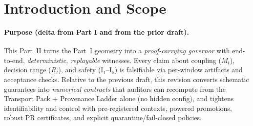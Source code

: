 \documentclass[10pt]{article}
\begin{document}
\section{Introduction and Scope}\label{sec:intro2}

\paragraph{Purpose (delta from Part I and from the prior draft).}
This Part~II turns the Part~I geometry into a \emph{proof-carrying governor} with end-to-end, \emph{deterministic, replayable} witnesses. Every claim about coupling ($M_t$), decision range ($R_t$), and safety (I$_1$--I$_5$) is falsifiable via per-window artifacts and acceptance checks. Relative to the previous draft, this revision converts schematic guarantees into \emph{numerical contracts} that auditors can recompute from the Transport Pack + Provenance Ladder alone (no hidden config), and tightens identifiability and control with pre-registered contexts, powered promotions, robust PR certificates, and explicit quarantine/fail-closed policies.
\end{document}
